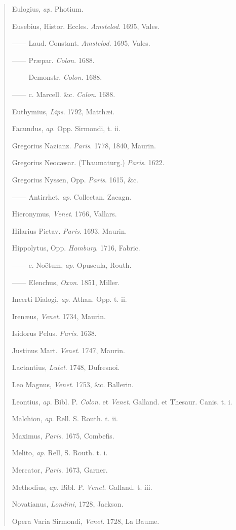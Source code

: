 \begin{quote}
Eulogius, \emph{ap}. Photium.

Eusebius, Histor. Eccles. \emph{Amstelod}. 1695, Vales.

—— Laud. Constant. \emph{Amstelod}. 1695, Vales.

—— Præpar. \emph{Colon}. 1688.

—— Demonstr. \emph{Colon}. 1688.

—— c. Marcell. \&c. \emph{Colon}. 1688.

Euthymius, \emph{Lips}. 1792, Matthæi.

Facundus, \emph{ap}. Opp. Sirmondi, t. ii.

Gregorius Nazianz. \emph{Paris}. 1778, 1840, Maurin.

Gregorius Neocæsar. (Thaumaturg.) \emph{Paris}. 1622.

Gregorius Nyssen, Opp. \emph{Paris}. 1615, \&c.

—— Antirrhet. \emph{ap}. Collectan. Zacagn.

Hieronymus, \emph{Venet}. 1766, Vallars.

Hilarius Pictav. \emph{Paris}. 1693, Maurin.

Hippolytus, Opp. \emph{Hamburg}. 1716, Fabric.

—— c. Noëtum, \emph{ap}. Opuscula, Routh.

—— Elenchus, \emph{Oxon}. 1851, Miller.

Incerti Dialogi, \emph{ap}. Athan. Opp. t. ii.

Irenæus, \emph{Venet}. 1734, Maurin.

Isidorus Pelus. \emph{Paris}. 1638.

Justinus Mart. \emph{Venet}. 1747, Maurin.

Lactantius, \emph{Lutet}. 1748, Dufresnoi.

Leo Magnus, \emph{Venet}. 1753, \&c. Ballerin.

Leontius, \emph{ap}. Bibl. P. \emph{Colon}. et \emph{Venet}. Galland.
et Thesaur. Canis. t. i.

Malchion, \emph{ap}. Rell. S. Routh. t. ii.

Maximus, \emph{Paris}. 1675, Combefis.

Melito, \emph{ap}. Rell, S. Routh. t. i.

Mercator, \emph{Paris}. 1673, Garner.

Methodius, \emph{ap}. Bibl. P. \emph{Venet}. Galland. t. iii.

Novatianus, \emph{Londini}, 1728, Jackson.

Opera Varia Sirmondi, \emph{Venet}. 1728, La Baume.


\end{quote}
